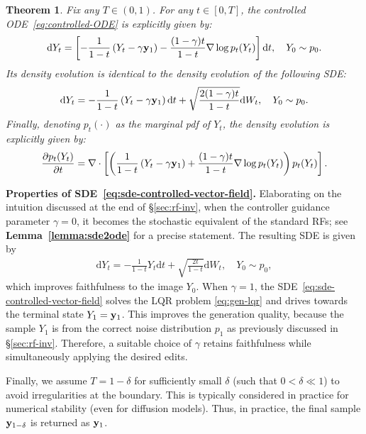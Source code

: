 \documentclass{article} %
\theoremstyle{plain}
\newtheorem{theorem}{Theorem}[section]
\newcommand{\deriv}{\mathrm{d}}
\begin{document}
\begin{theorem}
\label{theorem:sde-equiv-cntrl-ode}
Fix any $T \in (0, 1)$. For any $t \in [0, T]$, the controlled ODE~\eqref{eq:controlled-ODE} is explicitly given by:
\begin{align}
\label{eq:ode-controlled-vector-field}
    \deriv Y_t = \left[- \frac{1}{1-t}\left(Y_t - \gamma  \rvy_1\right) - \frac{(1-\gamma)t}{1-t} \nabla \log p_t(Y_t)\right]\deriv t,\quad Y_0 \sim p_0.
\end{align}
Its density evolution is identical to the density evolution of the following SDE:
\begin{align}
    \label{eq:sde-controlled-vector-field}
    \deriv Y_t = -\frac{1}{1-t}\left( Y_t -\gamma  \rvy_1\right) \deriv t + \sqrt{\frac{2(1-\gamma)t}{1-t}} \deriv W_t, \quad Y_0\sim p_0.
\end{align}
Finally, denoting $p_t(\cdot)$ as the marginal pdf of $Y_t$, the density evolution is explicitly given by: 
\begin{align}
    \frac{\partial p_t(Y_t)}{\partial t} = \nabla \cdot \left[\left( \frac{1}{1-t}\left(Y_t - \gamma  {\mathbf{y}}_1\right) + \frac{(1-\gamma)t}{1-t} \nabla \log p_t(Y_t)\right)p_t(Y_t)\right].
\end{align}
\end{theorem}

\textbf{Properties of SDE~\eqref{eq:sde-controlled-vector-field}.}
Elaborating on the intuition discussed at the end of \S\ref{sec:rf-inv}, 
when the controller guidance parameter $\gamma=0$, it becomes the stochastic equivalent of the standard RFs; see \textbf{Lemma~\ref{lemma:sde2ode}} for a precise statement. 
The resulting SDE is given by 
\begin{align}
    \label{eq:sde-optimal-vector-field}
    \deriv Y_t = -\frac{1}{1-t}Y_t \deriv t + \sqrt{\frac{2t}{1-t}} \deriv W_t, \quad Y_0\sim p_0,
\end{align}
which improves faithfulness to the image $Y_0$.
When $\gamma=1$, the SDE~\eqref{eq:sde-controlled-vector-field} solves the LQR problem \eqref{eq:gen-lqr} and drives towards the terminal state $Y_1 = {\mathbf{y}}_1$. This improves the generation quality, because the sample $Y_1$ is from the correct noise distribution $p_1$ as previously discussed in \S\ref{sec:rf-inv}. 
Therefore, a suitable choice of $\gamma$ retains faithfulness while simultaneously applying the desired edits.

Finally, we assume $T=1-\delta$ for sufficiently small $\delta$ (such that $0<\delta \ll 1$) to avoid irregularities at the boundary. This is typically considered in practice for numerical stability (even for diffusion models). Thus, in practice, the final sample ${\mathbf{y}}_{1-\delta}$ is returned as ${\mathbf{y}}_1$.
\end{document}
